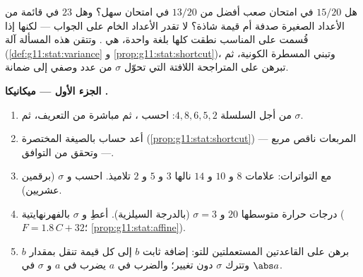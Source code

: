 \begin{problem}
\label{pb:g11:stat:1}
هل $15/20$ في امتحان صعب أفضل من $13/20$ في امتحان سهل؟ وهل
$23$ في قائمة من الأعداد الصغيرة صدفة أم قيمة شاذة؟ لا تقدر
الأعداد الخام على الجواب --- لكنها إذا قُسمت على 
المناسب نطقت كلها بلغة واحدة، هي \emph{}. وتتقن هذه
المسألة آلة 
(\cref{def:g11:stat:variance} و
\cref{prop:g11:stat:shortcut})، وتبني المسطرة الكونية، ثم
تبرهن على المتراجحة اللافتة التي تحوّل $\sigma$ من عدد
وصفي إلى ضمانة.

\medskip
\noindent\textbf{الجزء الأول --- ميكانيكا .}
\begin{enumerate}
  \item من أجل السلسلة $4, 8, 6, 5, 2$: احسب ، ثم
         مباشرة من التعريف، ثم
        $\sigma$.
  \item أعد حساب  بالصيغة المختصرة
        (\cref{prop:g11:stat:shortcut}) ---  المربعات
        ناقص مربع  --- وتحقق من التوافق.
  \item مع التواترات: علامات $8$ و $10$ و $14$ نالها
        $3$ و $5$ و $2$ تلاميذ. احسب   و
        $\sigma$ (برقمين عشريين).
  \item درجات حرارة متوسطها $20$ و $\sigma = 3$ (بالدرجة
        السيلزية). أعطِ  و $\sigma$ بالفهرنهايتية
        ($F = 1.8\,C + 32$؛ \cref{prop:g11:stat:affine}).
  \item برهن على القاعدتين المستعملتين للتو: إضافة ثابت $b$ إلى
        كل قيمة تنقل  بمقدار $b$ وتترك $\sigma$
        دون تغيير؛ والضرب في $a$ يضرب  في $a$
        و $\sigma$ في $\abs a$.
\end{enumerate}


\end{problem}
